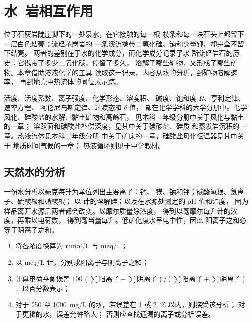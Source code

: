 \chapter{水–岩相互作用}\label{ch:b3:water-rock-interaction}

位于石灰岩陡崖脚下的一处泉水，在它接触的每一根
枝条和每一块石头上都留下一层白色结壳；流经花岗岩的
一条溪流携带二氧化硅、钠和少量钾，却完全不留下结壳。
两者的差别在于水的化学成分，而化学成分记录了水
所流经岩石的历史：它携带了多少二氧化碳，停留了多久，
溶解了哪些矿物，又形成了哪些矿物。本章借助溶液化学的工具
读取这一记录，内容从水的分析，到矿物溶解速率，
再到地壳中热流体的同位素示踪。

\begin{recall}
活度、活度系数、离子强度、化学形态、溶度积、
碱度、饱和度 $\Omega$、亨利定律、速率方程、
阿伦尼乌斯定律、过渡态和 $\delta$ 值，
都在化学学科的大学分册中。化学风化、硅酸盐的水解、黏土矿物和高岭石，
见本科一年级分册中关于风化与黏土的一章；
溶跃面和碳酸盐补偿深度，见其中关于碳酸盐、硅质
和蒸发岩沉积的一章。热液流体见本科二年级分册
中关于矿床的一章，硅酸盐风化恒温器见其中关于
地质时间气候的一章；
热液循环则见于中学教材。
\end{recall}

\section{天然水的分析}\label{sec:b3:water-rock-interaction:analysis}

一份水分析以毫克每升为单位列出主要离子：钙、
镁、钠和钾；碳酸氢根、氯离子、硫酸根和硝酸根；
以  计的溶解硅；以及在水源处测定的 pH 值和温度，
因为样品离开水源后两者都会改变。以摩尔质量除浓度，
得到以毫摩尔每升计的浓度，再乘以电荷数，
得到毫当量每升。低矿化度水呈电中性，因此
阳离子之和必等于阴离子之和。

\begin{method}[水分析的检验]\label{met:b3:water-rock-interaction:analysis}
\begin{enumerate}
\item 将各浓度换算为 \unit{mmol/L} 与 \unit{meq/L}；
\item 以 \unit{meq/L} 计，分别求阳离子与阴离子之和；
\item 计算电荷平衡误差 $100\,(\sum\text{阳离子} -
  \sum\text{阴离子})/(\sum\text{阳离子} + \sum\text{阴离子})$，以百分数表示；
\item 对于 250 至 \qty{1000}{mg/L} 的水，若误差在 1 或 \qty{2}{\percent} 以内，则接受该分析；
  对于更稀的水，误差允许略大；
  否则应查找遗漏的离子或分析误差。
\end{enumerate}
\end{method}

